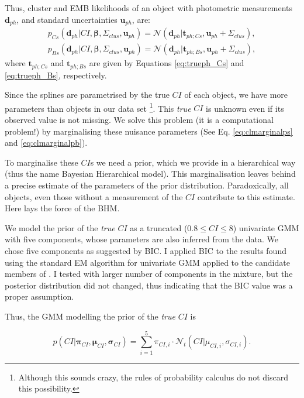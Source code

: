 Thus, cluster and EMB likelihoods of an object with photometric measurements $\mathbf{d}_{ph}$, and standard uncertainties $\mathbf{u}_{ph}$, are:
\begin{align}
\label{eq:lik-seq}
 p_{Cs}(\mathbf{d}_{ph}| CI, \boldsymbol{\beta},\Sigma_{clus},\mathbf{u}_{ph})={\mathcal{N}}(\mathbf{d}_{ph}|\boldsymbol{t}_{ph;Cs}, \mathbf{u}_{ph}+\Sigma_{clus}),\nonumber \\
p_{Bs}(\mathbf{d}_{ph}| CI, \boldsymbol{\beta},\Sigma_{clus}, \mathbf{u}_{ph})={\mathcal{N}}(\mathbf{d}_{ph}|\boldsymbol{t}_{ph;Bs}, \mathbf{u}_{ph}+\Sigma_{clus}),
\end{align}
where $\boldsymbol{t}_{ph;Cs}$ and $\boldsymbol{t}_{ph;Bs}$ are given by Equations \ref{eq:trueph_Cs} and \ref{eq:trueph_Bs}, respectively.

Since the splines are parametrised by the true $CI$ of each object, we have more parameters than objects in our data set \footnote{Although this sounds crazy, the rules of probability calculus do not discard this possibility.}. This \emph{true} $CI$ is unknown even if its observed value is not missing. We solve this problem (it is a computational problem!) by marginalising these nuisance parameters (See Eq. \ref{eq:clmarginalps} and \ref{eq:clmarginalpb}). 

To marginalise these $CI$s we need a prior, which we provide in a hierarchical way (thus the name Bayesian Hierarchical model). This marginalisation leaves behind a precise estimate of the parameters of the prior distribution. Paradoxically, all objects, even those without a measurement of the $CI$ contribute to this estimate. Here lays the force of the BHM.

We model the prior of the \emph{true} $CI$ as a truncated ($0.8\leq CI \leq8$) univariate GMM with five components, whose parameters are also inferred from the data. We chose five components as suggested by BIC. I applied BIC to the results found using the standard EM algorithm for univariate GMM applied to the candidate members of \citet{Bouy2015}. I tested with larger number of components in the mixture, but the posterior distribution did not changed, thus indicating that the BIC value was a proper assumption.

 Thus, the GMM modelling the prior of the \emph{true} $CI$ is 

\begin{equation}
\label{eq:colordist}
p(CI|\boldsymbol{\pi}_{CI},\boldsymbol{\mu}_{CI},\boldsymbol{\sigma}_{CI})= \sum_{i=1}^5 \pi_{CI,i} \cdot \mathcal{N}_t(CI| \mu_{CI,i},\sigma_{CI,i}).
\end{equation}

